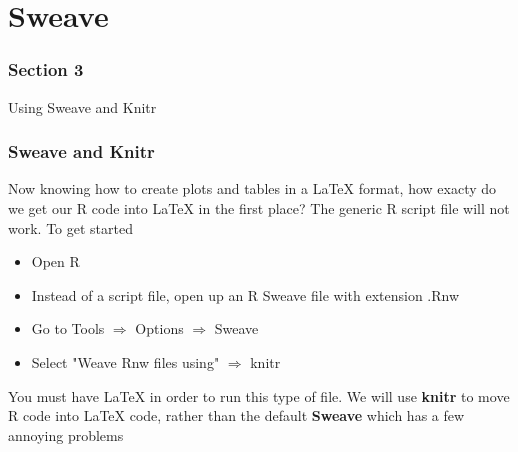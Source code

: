 \documentclass[nogin]{beamer}\usepackage[]{graphicx}\usepackage[]{color}
\begin{document}
\section{Sweave}
\begin{frame}
\frametitle{Section 3}
\begin{center}
\Large
Using Sweave and Knitr
\end{center}
\end{frame}

\begin{frame}
\frametitle{Sweave and Knitr}
Now knowing how to create plots and tables in a LaTeX format, how exacty do we get our R code into LaTeX in the first place? The generic R script file will not work. To get started
\begin{itemize}
\item Open R
\item Instead of a script file, open up an R Sweave file with extension .Rnw
\item Go to Tools $\Rightarrow$ Options $\Rightarrow$ Sweave
\item Select  "Weave Rnw files using" $\Rightarrow$ knitr
\end{itemize}
You must have LaTeX in order to run this type of file. We will use \textbf{knitr} to move R code into LaTeX code, rather than the default \textbf{Sweave} which has a few annoying problems
\end{frame}
\end{document}
